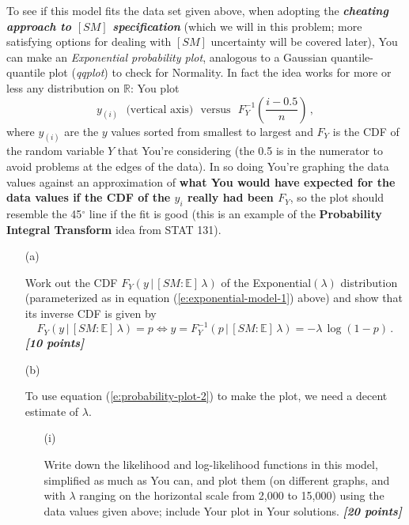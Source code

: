 \documentclass[12pt]{article}
\newcommand{\given}{\, | \,}
\newcommand{\bi}[1]{\b{\i{#1}}}
\renewcommand{\b}[1]{\textbf{#1}}
\renewcommand{\i}[1]{\textit{#1}}
\begin{document}
\begin{itemize}
\begin{itemize}
To see if this model fits the data set given above, when adopting the \bi{cheating approach to $[ SM ]$ specification} (which we will in this problem; more satisfying options for dealing with $[ SM ]$ uncertainty will be covered later), You can make an \textit{Exponential probability plot}, analogous to a Gaussian quantile-quantile plot (\textit{qqplot}) to check for Normality. In fact the idea works for more or less any distribution on $\mathbb{ R }$: You plot 
\begin{equation} \label{e:probability-plot-1}
y_{ ( i ) } \ \ \ \mbox{(vertical axis)} \ \ \ \mbox{versus} \ \ \ F_Y^{ -1 } \left( \frac{ i - 0.5 }{ n }
\right) \, ,
\end{equation}
where $y_{ ( i ) }$ are the $y$ values sorted from smallest to largest and $F_Y$ is the CDF of the random variable $Y$ that You're considering (the 0.5 is in the numerator to avoid problems at the edges of the data). In so doing You're graphing the data values against an approximation of \b{what You would have expected for the data values if the CDF of the $y_i$ really had been $F_Y$}, so the plot should resemble the 45$^\circ$ line if the fit is good (this is an example of the \b{Probability Integral Transform} idea from STAT 131).  

\begin{itemize}

\item[(a)] 

Work out the CDF $F_Y ( y \given [ SM \! : \! \mathbb{ E } ] \, \lambda )$ of the Exponential$( \lambda )$ distribution (parameterized as in equation (\ref{e:exponential-model-1}) above)
and show that its inverse CDF is given by
\begin{equation} \label{e:probability-plot-2}
F_Y ( y \given [ SM \! : \! \mathbb{ E } ] \, \lambda ) = p \iff y = F_Y^{ -1 }( p \given [ SM \! : \! \mathbb{ E } ] \, \lambda ) = - \lambda \, \log ( 1 - p ) \, .
\end{equation}
\bi{[10 points]} 

\item[(b)] 

To use equation (\ref{e:probability-plot-2}) to make the plot, we need a decent estimate of $\lambda$. 

\begin{itemize}

\item[(i)]

Write down the likelihood and log-likelihood functions in this model, simplified as much as You can, and plot them (on different graphs, and with $\lambda$ ranging on the horizontal scale from 2,000 to 15,000) using the data values given above; include Your plot in Your solutions. \bi{[20 points]} 


\end{itemize}
\end{itemize}
\end{itemize}
\end{itemize}
\end{document}
